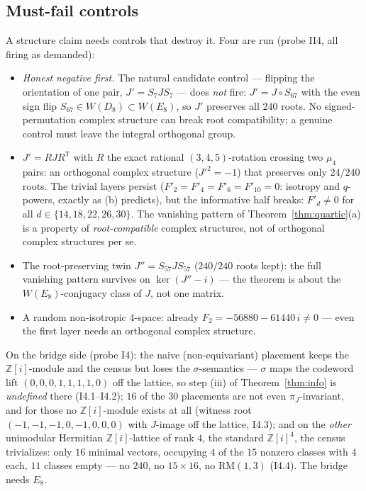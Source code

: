 \documentclass[11pt,a4paper]{article}
\theoremstyle{remark}
\newcommand{\Z}{\mathbb Z}
\begin{document}
\subsection{Must-fail controls}
A structure claim needs controls that destroy it.  Four are run
(probe II4, all firing as demanded):
\begin{itemize}
\item[(0)] \emph{Honest negative first.}  The natural candidate
control --- flipping the orientation of one pair,
$J'=S_7JS_7$ --- does \emph{not} fire: $J'=J\circ S_{67}$ with the
even sign flip $S_{67}\in W(D_8)\subset W(E_8)$, so $J'$ preserves
all $240$ roots.  No signed-permutation complex structure can break
root compatibility; a genuine control must leave the integral
orthogonal group.
\item[(a)] $J'=RJR^{\mathsf T}$ with $R$ the exact rational
$(3,4,5)$-rotation crossing two $\mu_4$ pairs: an orthogonal complex
structure ($J'^2=-1$) that preserves only $24/240$ roots.  The
trivial layers persist ($F'_2=F'_4=F'_6=F'_{10}=0$: isotropy and
$q$-powers, exactly as (b) predicts), but the informative half
breaks: $F'_d\neq0$ for all $d\in\{14,18,22,26,30\}$.  The vanishing
pattern of Theorem~\ref{thm:quartic}(a) is a property of
\emph{root-compatible} complex structures, not of orthogonal complex
structures per se.
\item[(b)] The root-preserving twin $J''=S_{57}JS_{57}$
($240/240$ roots kept): the full vanishing pattern survives on
$\ker(J''-i)$ --- the theorem is about the $W(E_8)$-conjugacy class
of $J$, not one matrix.
\item[(c)] A random non-isotropic $4$-space: already
$F_2=-56880-61440\,i\neq0$ --- even the first layer needs an
orthogonal complex structure.
\end{itemize}
On the bridge side (probe I4): the naive (non-equivariant) placement
keeps the $\Z[i]$-module and the census but loses the
$\sigma$-semantics --- $\sigma$ maps the codeword lift
$(0,0,0,1,1,1,1,0)$ off the lattice, so step (iii) of
Theorem~\ref{thm:info} is \emph{undefined} there (I4.1--I4.2);
$16$ of the $30$ placements are not even $\pi_J$-invariant, and for
those no $\Z[i]$-module exists at all (witness root
$(-1,-1,-1,0,-1,0,0,0)$ with $J$-image off the lattice, I4.3); and on
the \emph{other} unimodular Hermitian $\Z[i]$-lattice of rank $4$,
the standard $\Z[i]^4$, the census trivializes: only $16$ minimal
vectors, occupying $4$ of the $15$ nonzero classes with $4$ each,
$11$ classes empty --- no $240$, no $15\times16$, no
$\mathrm{RM}(1,3)$ (I4.4).  The bridge needs $E_8$.
\end{document}
